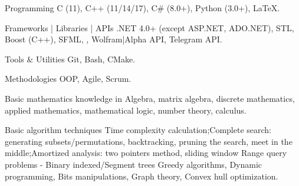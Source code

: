 

\begin{cvskills}


  \cvskill
    {\large Programming} %
    {{\large C (11)}, {\large C++ (11/14/17)}, {\large C\# (8.0+)}, {\large Python (3.0+)}, {\large LaTeX.}} %


  \cvskill
    {\large Frameworks | Libraries | APIs} %
    {{\large .NET 4.0+ (except ASP.NET, ADO.NET)}, {\large STL}, {\large Boost (C++)}, {\large SFML}, , {\large Wolfram|Alpha API},  {\large Telegram API.}} %


  \cvskill
    {\large Tools \& Utilities} %
    {{\large Git}, {\large Bash}, {\large CMake.}} %


  \cvskill
    {\large Methodologies} %
    {{\large OOP}, {\large Agile}, {\large Scrum.}} %


  \cvskill
    {\large Basic mathematics knowledge in} %
    {{\large Algebra, matrix algebra, discrete mathematics, applied mathematics, \newline mathematical logic, number theory, calculus.}} %


  \cvskill
    {\large Basic algorithm techniques} %
    {{\large \newline Time complexity calculation;\newline Complete search: generating subsets/permutations, backtracking, pruning \newline the search, meet in the middle;\newline Amortized analysis: two pointers method, sliding window \newline Range query problems - Binary indexed/Segment trees \newline Greedy algorithms, Dynamic programming, Bits manipulations, \newline Graph theory, Convex hull optimization.\newline}} %


\end{cvskills}
